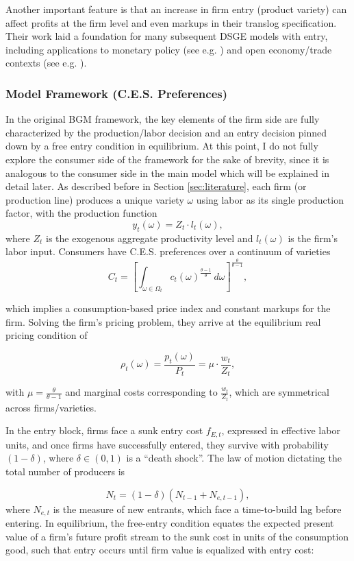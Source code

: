 \documentclass[a4paper,12pt]{article} %
\numberwithin{equation}{section} %
\numberwithin{figure}{section}
\numberwithin{table}{section}
\begin{document}
Another important feature is that an increase in firm entry (product variety) can affect profits at the firm level and even markups in their translog 
specification. Their work laid a foundation for many subsequent DSGE models with entry, including applications to monetary policy (see e.g. \cite{bergin2008extensive,etro2015new,bilbiie2014optimal}) and 
open economy/trade contexts (see e.g. \cite{epifani2011trade,bergin2015international}).


\subsubsection{Model Framework (C.E.S. Preferences)}
In the original BGM framework, the key elements of the firm side are fully characterized by the production/labor decision 
and an entry decision pinned down by a free entry condition in equilibrium. 
At this point, I do not fully explore the consumer side of the framework for the sake of brevity, since it is analogous to the consumer side in the main model which will be 
explained in detail later. As described before in Section \ref{sec:literature}, each firm (or production line) produces a unique variety $\omega$ using labor as its single 
production factor, with the production function 
\[
    y_t(\omega) = Z_t \cdot l_t(\omega),
\]
where $Z_t$ is the exogenous aggregate productivity level and $l_t(\omega)$ is the firm's labor input. Consumers have C.E.S. preferences over a continuum
of varieties 
\[
    C_t = \left[\int_{\omega \in \Omega_t} c_t(\omega)^{\frac{\theta-1}{\theta}}\,d\omega\right]^{\frac{\theta}{\theta-1}},
\]

which implies a consumption-based price index and constant markups for the firm. Solving the firm's pricing problem, they arrive at the equilibrium real pricing
condition of

 \[
    \rho_t(\omega) = \frac{p_t(\omega)}{P_t} =  \mu \cdot \frac{w_t}{Z_t},
 \]

with $\mu=\frac{\theta}{\theta-1}$ and marginal costs corresponding to $\frac{w_t}{Z_t}$, which are symmetrical across firms/varieties.

In the entry block, firms face a sunk entry cost $f_{E,t}$, expressed in effective labor units, and once firms have successfully entered, they survive
with probability $(1-\delta)$, where $\delta \in (0,1)$ is a ``death shock''. The law of motion dictating the total number of producers is 

    \[
    N_t = (1-\delta)(N_{t-1} + N_{e,t-1}),
    \]
where $N_{e,t}$ is the measure of new entrants, which face a time-to-build lag before entering. In equilibrium, the free-entry condition equates the expected present value of a firm's
future profit stream to the sunk cost in units of the consumption good, such that entry occurs until firm value is equalized with entry cost:
\end{document}
